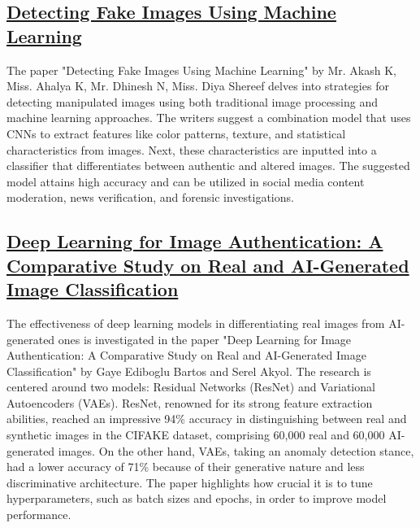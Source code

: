 \documentclass[10pt,twocolumn,letterpaper]{article}
\begin{document}
\subsection{\href{https://ijrpr.com/uploads/V4ISSUE4/IJRPR11629.pdf}{Detecting Fake Images Using Machine Learning}}
The paper "Detecting Fake Images Using Machine Learning" by Mr. Akash K, Miss. Ahalya K, Mr. Dhinesh N, Miss. Diya Shereef delves into strategies for detecting manipulated images using both traditional image processing and machine learning approaches. The writers suggest a combination model that uses CNNs to extract features like color patterns, texture, and statistical characteristics from images. Next, these characteristics are inputted into a classifier that differentiates between authentic and altered images. The suggested model attains high accuracy and can be utilized in social media content moderation, news verification, and forensic investigations.

\subsection{\href{https://www.researchgate.net/publication/375952278_Deep_Learning_for_Image_Authentication_A_Comparative_Study_on_Real_and_AI-Generated_Image_Classification}{Deep Learning for Image Authentication: A Comparative Study on Real and AI-Generated Image Classification}}
The effectiveness of deep learning models in differentiating real images from AI-generated ones is investigated in the paper "Deep Learning for Image Authentication: A Comparative Study on Real and AI-Generated Image Classification" by Gaye Ediboglu Bartos and Serel Akyol. The research is centered around two models: Residual Networks (ResNet) and Variational Autoencoders (VAEs). ResNet, renowned for its strong feature extraction abilities, reached an impressive 94\% accuracy in distinguishing between real and synthetic images in the CIFAKE dataset, comprising 60,000 real and 60,000 AI-generated images. On the other hand, VAEs, taking an anomaly detection stance, had a lower accuracy of 71\% because of their generative nature and less discriminative architecture. The paper highlights how crucial it is to tune hyperparameters, such as batch sizes and epochs, in order to improve model performance.
\end{document}
